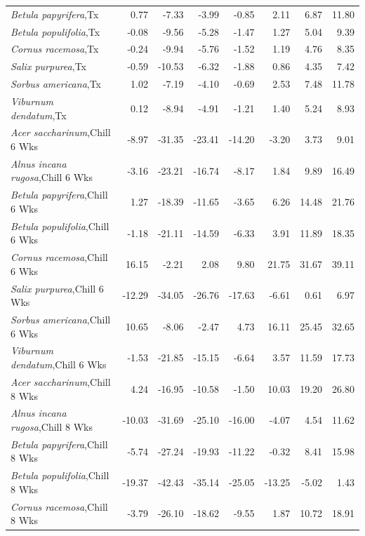 \documentclass{article}\usepackage[]{graphicx}\usepackage[]{color}
\begin{document}
\begin{longtable}{lrrrrrrr}
  \textit{Betula papyrifera},Tx & 0.77 & -7.33 & -3.99 & -0.85 & 2.11 & 6.87 & 11.80 \\ 
  \textit{Betula populifolia},Tx & -0.08 & -9.56 & -5.28 & -1.47 & 1.27 & 5.04 & 9.39 \\ 
  \textit{Cornus racemosa},Tx & -0.24 & -9.94 & -5.76 & -1.52 & 1.19 & 4.76 & 8.35 \\ 
  \textit{Salix purpurea},Tx & -0.59 & -10.53 & -6.32 & -1.88 & 0.86 & 4.35 & 7.42 \\ 
  \textit{Sorbus americana},Tx & 1.02 & -7.19 & -4.10 & -0.69 & 2.53 & 7.48 & 11.78 \\ 
  \textit{Viburnum dendatum},Tx & 0.12 & -8.94 & -4.91 & -1.21 & 1.40 & 5.24 & 8.93 \\ 
  \textit{Acer saccharinum},Chill 6 Wks & -8.97 & -31.35 & -23.41 & -14.20 & -3.20 & 3.73 & 9.01 \\ 
  \textit{Alnus incana rugosa},Chill 6 Wks & -3.16 & -23.21 & -16.74 & -8.17 & 1.84 & 9.89 & 16.49 \\ 
  \textit{Betula papyrifera},Chill 6 Wks & 1.27 & -18.39 & -11.65 & -3.65 & 6.26 & 14.48 & 21.76 \\ 
  \textit{Betula populifolia},Chill 6 Wks & -1.18 & -21.11 & -14.59 & -6.33 & 3.91 & 11.89 & 18.35 \\ 
  \textit{Cornus racemosa},Chill 6 Wks & 16.15 & -2.21 & 2.08 & 9.80 & 21.75 & 31.67 & 39.11 \\ 
  \textit{Salix purpurea},Chill 6 Wks & -12.29 & -34.05 & -26.76 & -17.63 & -6.61 & 0.61 & 6.97 \\ 
  \textit{Sorbus americana},Chill 6 Wks & 10.65 & -8.06 & -2.47 & 4.73 & 16.11 & 25.45 & 32.65 \\ 
  \textit{Viburnum dendatum},Chill 6 Wks & -1.53 & -21.85 & -15.15 & -6.64 & 3.57 & 11.59 & 17.73 \\ 
  \textit{Acer saccharinum},Chill 8 Wks & 4.24 & -16.95 & -10.58 & -1.50 & 10.03 & 19.20 & 26.80 \\ 
  \textit{Alnus incana rugosa},Chill 8 Wks & -10.03 & -31.69 & -25.10 & -16.00 & -4.07 & 4.54 & 11.62 \\ 
  \textit{Betula papyrifera},Chill 8 Wks & -5.74 & -27.24 & -19.93 & -11.22 & -0.32 & 8.41 & 15.98 \\ 
  \textit{Betula populifolia},Chill 8 Wks & -19.37 & -42.43 & -35.14 & -25.05 & -13.25 & -5.02 & 1.43 \\ 
  \textit{Cornus racemosa},Chill 8 Wks & -3.79 & -26.10 & -18.62 & -9.55 & 1.87 & 10.72 & 18.91 \\ 

\end{longtable}
\end{document}
